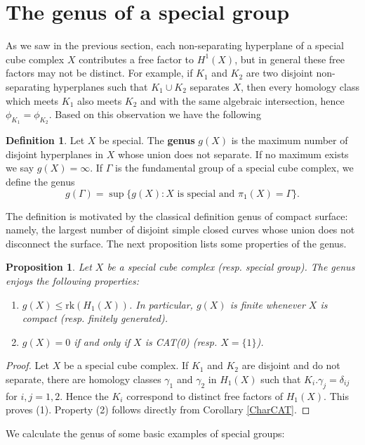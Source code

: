 \documentclass[11pt]{amsart}
\numberwithin{thm}{section}
\newtheorem{proposition}[thm]{Proposition}
\theoremstyle{remark}
\theoremstyle{definition}
\newtheorem{definition}[thm]{Definition}
\begin{document}
\section{The genus of a special group}
As we saw in the previous section, each non-separating hyperplane of a special cube complex $X$ contributes a free factor to $H^1(X)$, but in general these free factors may not be distinct.  For example, if $K_1$ and $K_2$ are two disjoint non-separating hyperplanes such that $K_1\cup K_2$ separates $X$, then every homology class which meets $K_1$ also meets $K_2$ and with the same algebraic intersection, hence $\phi_{K_1}=\phi_{K_2}$.  Based on this observation we have the following
\begin{definition} Let $X$ be special.  The \textbf{genus} $g(X)$ is the maximum number of disjoint hyperplanes in $X$ whose union does not separate. If no maximum exists we say $g(X)=\infty$.  If $\Gamma$ is the fundamental group of a special cube complex, we define the genus \[g(\Gamma)=\sup\{g(X)\colon X\mbox{ is special and $\pi_1(X)=\Gamma$}\}.\]
\end{definition}

The definition is motivated by the classical definition genus of compact surface: namely, the largest number of disjoint simple closed curves whose union does not disconnect the surface. The next proposition lists some properties of the genus.  

\begin{proposition} \label{gProps} Let $X$ be a special cube complex (resp. special group). The genus enjoys the following properties:
\begin{enumerate}
\item $g(X)\leq \text{rk}(H_1(X))$. In particular, $g(X)$ is finite whenever $X$ is compact (resp. finitely generated).  
\item $g(X)=0$ if and only if $X$ is CAT(0) (resp. $X=\{1\}$).

\end{enumerate} 
\end{proposition}
\begin{proof} Let $X$ be a special cube complex.  If $K_1$ and $K_2$ are disjoint and do not separate, there are homology classes $\gamma_1$ and $\gamma_2$ in $H_1(X)$ such that $K_i. \gamma_j=\delta_{ij}$ for $i,j=1,2$.  Hence the $K_i$ correspond to distinct free factors of $H_1(X)$.  This proves (1).  Property (2) follows directly from Corollary \ref{CharCAT}.  
\end{proof}
\noindent
We calculate the genus of some basic examples of special groups:
\end{document}
